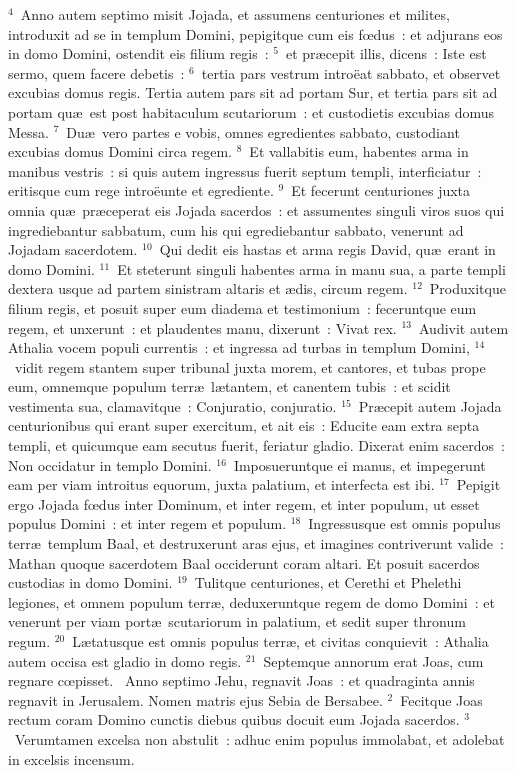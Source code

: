 ${}^{4}$~Anno autem septimo misit Jojada, et assumens centuriones et milites, introduxit ad se in templum Domini, pepigitque cum eis fœdus~: et adjurans eos in domo Domini, ostendit eis filium regis~:
${}^{5}$~et pr\ae cepit illis, dicens~: Iste est sermo, quem facere debetis~:
${}^{6}$~tertia pars vestrum intro\"eat sabbato, et observet excubias domus regis. Tertia autem pars sit ad portam Sur, et tertia pars sit ad portam qu\ae\ est post habitaculum scutariorum~: et custodietis excubias domus Messa.
${}^{7}$~Du\ae\ vero partes e vobis, omnes egredientes sabbato, custodiant excubias domus Domini circa regem.
${}^{8}$~Et vallabitis eum, habentes arma in manibus vestris~: si quis autem ingressus fuerit septum templi, interficiatur~: eritisque cum rege intro\"eunte et egrediente.
${}^{9}$~Et fecerunt centuriones juxta omnia qu\ae\ pr\ae ceperat eis Jojada sacerdos~: et assumentes singuli viros suos qui ingrediebantur sabbatum, cum his qui egrediebantur sabbato, venerunt ad Jojadam sacerdotem.
${}^{10}$~Qui dedit eis hastas et arma regis David, qu\ae\ erant in domo Domini.
${}^{11}$~Et steterunt singuli habentes arma in manu sua, a parte templi dextera usque ad partem sinistram altaris et \ae dis, circum regem.
${}^{12}$~Produxitque filium regis, et posuit super eum diadema et testimonium~: feceruntque eum regem, et unxerunt~: et plaudentes manu, dixerunt~: Vivat rex.
${}^{13}$~Audivit autem Athalia vocem populi currentis~: et ingressa ad turbas in templum Domini,
${}^{14}$~vidit regem stantem super tribunal juxta morem, et cantores, et tubas prope eum, omnemque populum terr\ae\ l\ae tantem, et canentem tubis~: et scidit vestimenta sua, clamavitque~: Conjuratio, conjuratio.
${}^{15}$~Pr\ae cepit autem Jojada centurionibus qui erant super exercitum, et ait eis~: Educite eam extra septa templi, et quicumque eam secutus fuerit, feriatur gladio. Dixerat enim sacerdos~: Non occidatur in templo Domini.
${}^{16}$~Imposueruntque ei manus, et impegerunt eam per viam introitus equorum, juxta palatium, et interfecta est ibi.
${}^{17}$~Pepigit ergo Jojada fœdus inter Dominum, et inter regem, et inter populum, ut esset populus Domini~: et inter regem et populum.
${}^{18}$~Ingressusque est omnis populus terr\ae\ templum Baal, et destruxerunt aras ejus, et imagines contriverunt valide~: Mathan quoque sacerdotem Baal occiderunt coram altari. Et posuit sacerdos custodias in domo Domini.
${}^{19}$~Tulitque centuriones, et Cerethi et Phelethi legiones, et omnem populum terr\ae , deduxeruntque regem de domo Domini~: et venerunt per viam port\ae\ scutariorum in palatium, et sedit super thronum regum.
${}^{20}$~L\ae tatusque est omnis populus terr\ae , et civitas conquievit~: Athalia autem occisa est gladio in domo regis.
${}^{21}$~Septemque annorum erat Joas, cum regnare cœpisset.
~\lettrine[lines=10,image=true,loversize=0.05,lraise=-0.03]{A}{}nno septimo Jehu, regnavit Joas~: et quadraginta annis regnavit in Jerusalem. Nomen matris ejus Sebia de Bersabee.
${}^{2}$~Fecitque Joas rectum coram Domino cunctis diebus quibus docuit eum Jojada sacerdos.
${}^{3}$~Verumtamen excelsa non abstulit~: adhuc enim populus immolabat, et adolebat in excelsis incensum.


